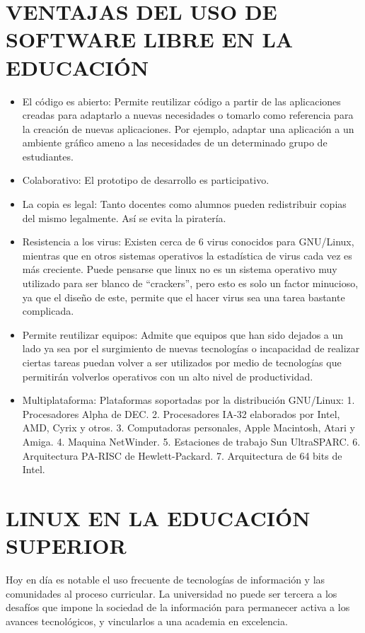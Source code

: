 \section*{VENTAJAS DEL USO DE SOFTWARE LIBRE EN LA EDUCACIÓN}
\begin{itemize}
  \item El código es abierto: Permite reutilizar código a partir de
	las aplicaciones creadas para adaptarlo a nuevas
	necesidades o tomarlo como referencia para la creación
	de nuevas aplicaciones. Por ejemplo, adaptar una
	aplicación a un ambiente gráfico ameno a las necesidades
	de un determinado grupo de estudiantes.
  \item Colaborativo: El prototipo de desarrollo es participativo.
  \item La copia es legal: Tanto docentes como alumnos pueden
	redistribuir copias del mismo legalmente. Así se evita la
	piratería.
  \item Resistencia a los virus: Existen cerca de 6 virus conocidos
	para GNU/Linux, mientras que en otros sistemas
	operativos la estadística de virus cada vez es más
	creciente. Puede pensarse que linux no es un sistema
	operativo muy utilizado para ser blanco de “crackers”,
	pero esto es solo un factor minucioso, ya que el diseño de
	este, permite que el hacer virus sea una tarea bastante
	complicada.
  \item Permite reutilizar equipos: Admite que equipos que han
	sido dejados a un lado ya sea por el surgimiento de
	nuevas tecnologías o incapacidad de realizar ciertas
	tareas puedan volver a ser utilizados por medio de
	tecnologías que permitirán volverlos operativos con un
	alto nivel de productividad.
  \item Multiplataforma: Plataformas soportadas por la
	distribución GNU/Linux:
	1. Procesadores Alpha de DEC.
	2. Procesadores IA-32 elaborados por Intel, AMD, Cyrix y otros.
	3. Computadoras personales, Apple Macintosh, Atari y Amiga.
	4. Maquina NetWinder.
	5. Estaciones de trabajo Sun UltraSPARC.
	6. Arquitectura PA-RISC de Hewlett-Packard.
	7. Arquitectura de 64 bits de Intel.
\end{itemize}

\section*{LINUX EN LA EDUCACIÓN SUPERIOR}
Hoy en día es notable el uso frecuente de tecnologías de
información y las comunidades al proceso curricular. La
universidad no puede ser tercera a los desafíos que impone la
sociedad de la información para permanecer activa a los avances
tecnológicos, y vincularlos a una academia en excelencia.

